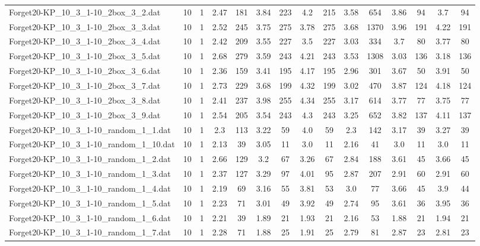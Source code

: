 \begin{table}[!ht]
{\begin{tabular}{lcccccccccccccc}
Forget20-KP\_10\_3\_1-10\_2box\_3\_2.dat & 10 & 1 & 2.47 & 181 & 3.84 & 223 & 4.2 & 215 & 3.58 & 654 & 3.86 & 94 & 3.7 & 94 \\
Forget20-KP\_10\_3\_1-10\_2box\_3\_3.dat & 10 & 1 & 2.52 & 245 & 3.75 & 275 & 3.78 & 275 & 3.68 & 1370 & 3.96 & 191 & 4.22 & 191 \\
Forget20-KP\_10\_3\_1-10\_2box\_3\_4.dat & 10 & 1 & 2.42 & 209 & 3.55 & 227 & 3.5 & 227 & 3.03 & 334 & 3.7 & 80 & 3.77 & 80 \\
Forget20-KP\_10\_3\_1-10\_2box\_3\_5.dat & 10 & 1 & 2.68 & 279 & 3.59 & 243 & 4.21 & 243 & 3.53 & 1308 & 3.03 & 136 & 3.18 & 136 \\
Forget20-KP\_10\_3\_1-10\_2box\_3\_6.dat & 10 & 1 & 2.36 & 159 & 3.41 & 195 & 4.17 & 195 & 2.96 & 301 & 3.67 & 50 & 3.91 & 50 \\
Forget20-KP\_10\_3\_1-10\_2box\_3\_7.dat & 10 & 1 & 2.73 & 229 & 3.68 & 199 & 4.32 & 199 & 3.02 & 470 & 3.87 & 124 & 4.18 & 124 \\
Forget20-KP\_10\_3\_1-10\_2box\_3\_8.dat & 10 & 1 & 2.41 & 237 & 3.98 & 255 & 4.34 & 255 & 3.17 & 614 & 3.77 & 77 & 3.75 & 77 \\
Forget20-KP\_10\_3\_1-10\_2box\_3\_9.dat & 10 & 1 & 2.54 & 205 & 3.54 & 243 & 4.3 & 243 & 3.25 & 652 & 3.82 & 137 & 4.11 & 137 \\
Forget20-KP\_10\_3\_1-10\_random\_1\_1.dat & 10 & 1 & 2.3 & 113 & 3.22 & 59 & 4.0 & 59 & 2.3 & 142 & 3.17 & 39 & 3.27 & 39 \\
Forget20-KP\_10\_3\_1-10\_random\_1\_10.dat & 10 & 1 & 2.13 & 39 & 3.05 & 11 & 3.0 & 11 & 2.16 & 41 & 3.0 & 11 & 3.0 & 11 \\
Forget20-KP\_10\_3\_1-10\_random\_1\_2.dat & 10 & 1 & 2.66 & 129 & 3.2 & 67 & 3.26 & 67 & 2.84 & 188 & 3.61 & 45 & 3.66 & 45 \\
Forget20-KP\_10\_3\_1-10\_random\_1\_3.dat & 10 & 1 & 2.37 & 127 & 3.29 & 97 & 4.01 & 95 & 2.87 & 207 & 2.91 & 60 & 2.91 & 60 \\
Forget20-KP\_10\_3\_1-10\_random\_1\_4.dat & 10 & 1 & 2.19 & 69 & 3.16 & 55 & 3.81 & 53 & 3.0 & 77 & 3.66 & 45 & 3.9 & 44 \\
Forget20-KP\_10\_3\_1-10\_random\_1\_5.dat & 10 & 1 & 2.23 & 71 & 3.01 & 49 & 3.92 & 49 & 2.74 & 95 & 3.61 & 36 & 3.95 & 36 \\
Forget20-KP\_10\_3\_1-10\_random\_1\_6.dat & 10 & 1 & 2.21 & 39 & 1.89 & 21 & 1.93 & 21 & 2.16 & 53 & 1.88 & 21 & 1.94 & 21 \\
Forget20-KP\_10\_3\_1-10\_random\_1\_7.dat & 10 & 1 & 2.28 & 71 & 1.88 & 25 & 1.91 & 25 & 2.79 & 81 & 2.87 & 23 & 2.81 & 23 \\

\end{tabular}}
\end{table}
